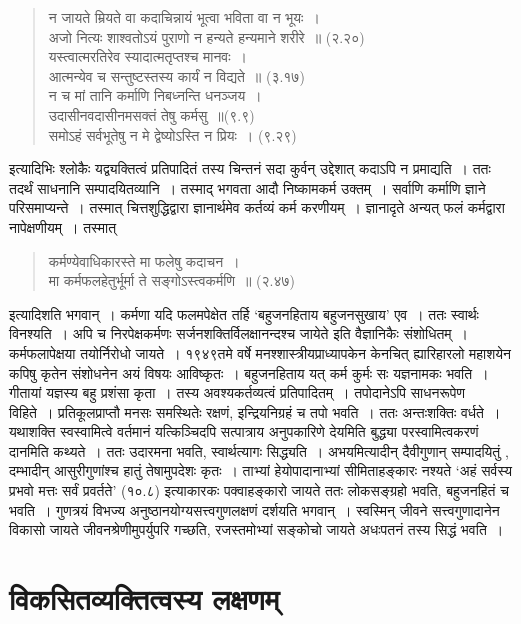 {\begin{verse}
न जायते म्रियते वा कदाचिन्नायं भूत्वा भविता वा न भूयः~। \\
अजो नित्यः शाश्वतोऽयं पुराणो न हन्यते हन्यमाने शरीरे~॥ (२.२०) \\
यस्त्वात्मरतिरेव स्यादात्मतृप्तश्च मानवः~। \\
आत्मन्येव च सन्तुष्टस्तस्य कार्यं न विद्यते~॥ (३.१७)\\
न च मां तानि कर्माणि निबध्नन्ति धनञ्जय~। \\
उदासीनवदासीनमसक्तं तेषु कर्मसु~॥(९.९)\\
समोऽहं सर्वभूतेषु न मे द्वेष्योऽस्ति न प्रियः~। (९.२९)
\end{verse}
इत्यादिभिः श्लोकैः यद्व्यक्तित्वं प्रतिपादितं तस्य चिन्तनं सदा कुर्वन् उद्देशात् कदाऽपि न प्रमाद्यति~। ततः तदर्थं साधनानि सम्पादयितव्यानि~। तस्माद् भगवता आदौ निष्कामकर्म उक्तम्~। सर्वाणि कर्माणि ज्ञाने परिसमाप्यन्ते~। तस्मात् चित्तशुद्धिद्वारा ज्ञानार्थमेव कर्तव्यं कर्म करणीयम्~। ज्ञानादृते अन्यत् फलं कर्मद्वारा नापेक्षणीयम्~। तस्मात् 
\begin{verse}
कर्मण्येवाधिकारस्ते मा फलेषु कदाचन~। \\
मा कर्मफलहेतुर्भूर्मा ते सङ्गोऽस्त्वकर्मणि~॥ (२.४७)
\end{verse}
इत्यादिशति भगवान्~। कर्मणा यदि फलमपेक्षेत तर्हि ‘बहुजनहिताय बहुजनसुखाय' एव~। ततः स्वार्थः विनश्यति~। अपि च निरपेक्षकर्मणः सर्जनशक्तिर्विलक्षानन्दश्च जायेते इति वैज्ञानिकैः संशोधितम्~। कर्मफलापेक्षया तयोर्निरोधो जायते~। १९४९तमे वर्षे मनश्शास्त्रीयप्राध्यापकेन केनचित् ह्यारिहारलो महाशयेन कपिषु कृतेन संशोधनेन अयं विषयः आविष्कृतः~। बहुजनहिताय यत् कर्म कुर्मः सः यज्ञनामकः भवति~। गीतायां यज्ञस्य बहु प्रशंसा कृता~। तस्य अवश्यकर्तव्यत्वं प्रतिपादितम्~। तपोदानेऽपि साधनरूपेण विहिते~। प्रतिकूलप्राप्तौ मनसः समस्थितेः रक्षणं, इन्द्रियनिग्रहं च तपो भवति~। ततः अन्तःशक्तिः वर्धते~। यथाशक्ति स्वस्वामित्वे वर्तमानं यत्किञ्चिदपि सत्पात्राय अनुपकारिणे देयमिति बुद्ध्या परस्वामित्वकरणं दानमिति कथ्यते~। ततः उदारमना भवति, स्वार्थत्यागः सिद्ध्यति~। अभयमित्यादीन् दैवीगुणान् सम्पादयितुं , दम्भादीन् आसुरीगुणांश्च हातुं तेषामुपदेशः कृतः~। ताभ्यां हेयोपादानाभ्यां सीमिताहङ्कारः नश्यते ‘अहं सर्वस्य प्रभवो मत्तः सर्वं प्रवर्तते' (१०.८) इत्याकारकः पक्वाहङ्कारो जायते ततः लोकसङ्ग्रहो भवति, बहुजनहितं च भवति~। गुणत्रयं विभज्य अनुष्ठानयोग्यसत्त्वगुणलक्षणं दर्शयति भगवान्~। स्वस्मिन् जीवने सत्त्वगुणादानेन विकासो जायते  जीवनश्रेणीमुपर्युपरि गच्छति, रजस्तमोभ्यां सङ्कोचो जायते अधःपतनं तस्य सिद्धं भवति~। 

\section*{विकसितव्यक्तित्वस्य लक्षणम्} 

}
